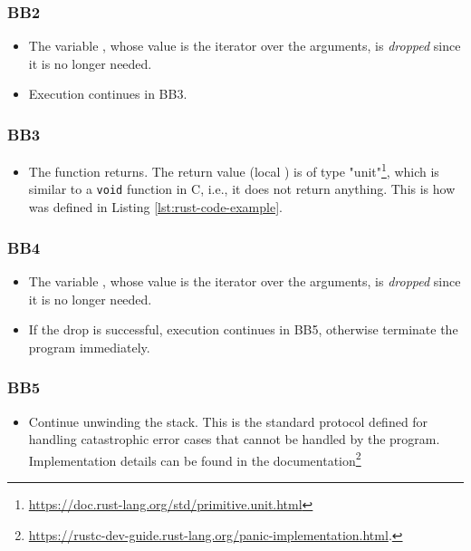 \subsubsection{BB2}

\begin{itemize}
    \item The variable , whose value is the iterator over the arguments,
          is \emph{dropped} since it is no longer needed.
    \item Execution continues in BB3.
\end{itemize}

\subsubsection{BB3}

\begin{itemize}
    \item The function returns.
          The return value (local ) is of type "unit"\footnote{\url{https://doc.rust-lang.org/std/primitive.unit.html}},
          which is similar to a \texttt{void} function in C, i.e., it does not return anything.
          This is how  was defined in Listing \ref{lst:rust-code-example}.
\end{itemize}

\subsubsection{BB4}

\begin{itemize}
    \item The variable , whose value is the iterator over the arguments,
          is \emph{dropped} since it is no longer needed.
    \item If the drop is successful, execution continues in BB5,
          otherwise terminate the program immediately.
\end{itemize}

\subsubsection{BB5}

\begin{itemize}
    \item Continue unwinding the stack.
          This is the standard protocol defined for handling catastrophic error cases
          that cannot be handled by the program.
          Implementation details can be found in the
          documentation\footnote{\url{https://rustc-dev-guide.rust-lang.org/panic-implementation.html}.}
\end{itemize}